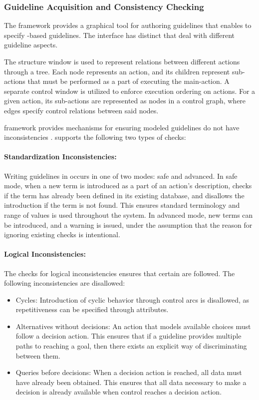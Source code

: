 \subsubsection{Guideline Acquisition and Consistency Checking}

The \GLARE{} framework provides a graphical tool for authoring guidelines
that enables \HCPs{} to specify \GLARE{}-based guidelines.
The interface has distinct  that deal with different guideline
aspects.

The structure window is used to represent relations
between different actions through a tree. Each node represents
an action, and its children represent sub-actions that must be performed
as a part of executing the main-action.
A separate control window is utilized to enforce execution
ordering on actions. For a given action, its sub-actions
are represented as nodes in a control graph, where edges
specify control relations between said nodes.

\GLARE{} framework provides mechanisms for ensuring modeled
guidelines do not have inconsistencies \cite{TerenzianiAIM01}. \GLARE{} supports the
following two types of checks:

\paragraph{Standardization Inconsistencies:}

Writing guidelines in \GLARE{} occurs in one of two modes: safe and
advanced. In safe mode, when a new term is introduced as a part of
an action's description, \GLARE{} checks if the term has already been
defined in its existing database, and disallows the introduction if
the term is not found. This ensures standard terminology and range of values
is used throughout the system. In advanced mode, new terms can be introduced,
and a warning is issued, under the assumption that the reason for ignoring
existing checks is intentional.

\paragraph{Logical Inconsistencies:}

The checks for logical inconsistencies ensures that certain  are followed. The following inconsistencies are disallowed:

\begin{itemize}
  \item Cycles: Introduction of cyclic behavior through control arcs is
    disallowed, as repetitiveness can be specified through attributes.
  \item Alternatives without decisions: An action that models available choices
    must follow a decision action. This ensures that if a guideline provides
    multiple paths to reaching a goal, then there exists an explicit way of
    discriminating between them.
  \item Queries before decisions: When a decision action is reached, all
    data must have already been obtained. This ensures that all data
    necessary to make a decision is already available when control reaches
    a decision action.
\end{itemize}

